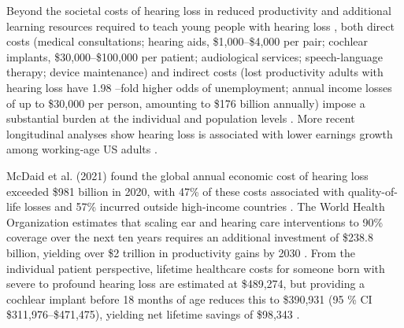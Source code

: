 \documentclass[referee,pdflatex, sn-vancouver-num]{sn-jnl}%
\theoremstyle{thmstyleone}%
\theoremstyle{thmstyletwo}%
\theoremstyle{thmstylethree}%
\DeclareRobustCommand{\textendash}{\ifmmode\text{-}\else\leavevmode\hbox{--}\fi}
\begin{document}
Beyond the societal costs of hearing loss in reduced productivity and additional learning resources required to teach young people with hearing loss \cite{SocietyCosts2000}, both direct costs (medical consultations; hearing aids, \$1,000--\$4,000 per pair; cochlear implants, \$30,000--\$100,000 per patient; audiological services; speech-language therapy; device maintenance) and indirect costs (lost productivity \textemdash adults with hearing loss have 1.98 \textendash fold higher odds of unemployment; annual income losses of up to \$30,000 per person, amounting to \$176 billion annually) impose a substantial burden at the individual and population levels \cite{SocietyCosts2000, Kim2020, Colburn2019, WHO2025, Battmer2010_ICR, Kim2020_JAMAOto_RevisionDeviceFailure, ANSI_AAMI_CI86_2017,FDA_Recognized_CI86}. 
More recent longitudinal analyses show hearing loss is associated with lower earnings growth among working‑age US adults \cite{Denham2024_JAMAHealthForum}. 

McDaid et al. (2021) found the global annual economic cost of hearing loss exceeded \$981 billion in 2020, with 47\% of these costs associated with quality-of-life losses and 57\% incurred outside high-income countries \cite{McDaid2021,Tordrup2022}. The World Health Organization estimates that scaling ear and hearing care interventions to 90\% coverage over the next ten years requires an additional investment of \$238.8 billion, yielding over \$2 trillion in productivity gains by 2030 \cite{Tordrup2022}.  From the individual patient perspective, lifetime healthcare costs for someone born with severe to profound hearing loss are estimated at \$489,274, but providing a cochlear implant before 18 months of age reduces this to \$390,931 (95 \% CI \$311,976--\$471,475), yielding net lifetime savings of \$98,343 \cite{Cejas2024}.
\end{document}
